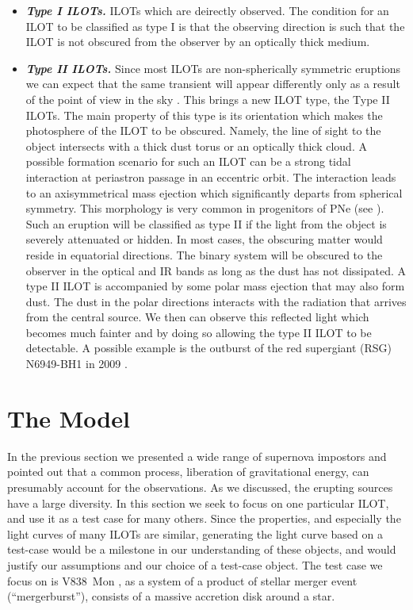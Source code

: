 \documentclass[modern]{aastex62}
\newcommand{\emphbf}[1]{\textbf{\emph{#1}}}
\begin{document}
\begin{itemize}
\item \emphbf{Type I ILOTs.} ILOTs which are deirectly observed. The condition for an ILOT to be classified as type I is that the observing direction is such that the ILOT is not obscured from the observer by an optically thick medium.
\item \emphbf{Type II ILOTs.}  Since most ILOTs are non-spherically symmetric eruptions we can expect that the same transient will appear differently only as a result of the point of view in the sky \citep{2017MNRAS.467.3299K}. 
This brings a new ILOT type, the Type II ILOTs.
The main property of this type is its orientation which makes the photosphere of the ILOT to be obscured.
Namely, the line of sight to the object intersects with a thick dust torus or an optically thick cloud.
A possible formation scenario for such an ILOT can be a strong tidal interaction at periastron passage in an eccentric orbit. 
The interaction leads to an axisymmetrical mass ejection which significantly departs from spherical symmetry.
This morphology is very common in progenitors of PNe (see \citealt{1987AJ.....94..671B,1995A&A...293..871C,1996iacm.book.....M,2011apn5.confP..21S,2016JPhCS.728c2008P}).
Such an eruption will be classified as type II if the light from the object is severely attenuated or hidden.
In most cases, the obscuring matter would reside in equatorial directions. 
The binary system will be obscured to the observer in the optical and IR bands as long as the dust has not dissipated.
A type II ILOT is accompanied by some polar mass ejection that may also form dust.
The dust in the polar directions interacts with the radiation that arrives from the central source.
We then can observe this reflected light which becomes much fainter and by doing so allowing the type II ILOT to be detectable. 
A possible example is the outburst of the red supergiant (RSG) N6949-BH1 in 2009 \citep{2017MNRAS.468.4968A}.

\end{itemize}


\section{The Model}

In the previous section we presented a wide range of supernova impostors and pointed out that a common process, liberation of gravitational energy, can presumably account for the observations.
As we discussed, the erupting sources have a large diversity.
In this section we seek to focus on one particular ILOT, and use it as a test case for many others.
Since the properties, and especially the light curves of many ILOTs are similar, generating the light curve based on a test-case would be a milestone in our understanding of these objects, and would justify our assumptions and our choice of a test-case object.
The test case we focus on is V838~Mon \citep{2005A&A...436.1009T,2006A&A...451..223T}, as a system of a product of stellar merger event (``mergerburst''), consists of a massive accretion disk around a star.
\end{document}
